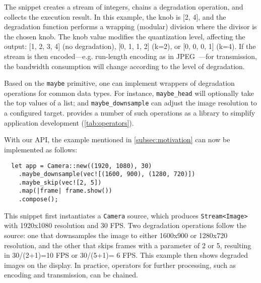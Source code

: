 The snippet creates a stream of integers, chains a degradation operation, and
collects the execution result. In this example, the knob is [2, 4], and the
degradation function performs a wrapping (modular) division where the divisor is
the chosen knob. The knob value modifies the quantization level, affecting the
output: [1, 2, 3, 4] (no degradation), [0, 1, 1, 2] (k=2), or [0, 0, 0, 1]
(k=4). If the stream is then encoded---e.g. run-length encoding as in
JPEG~\cite{wallace1992jpeg}---for transmission, the bandwidth consumption will
change according to the level of degradation.

Based on the \texttt{maybe} primitive, one can implement wrappers of degradation
operations for common data types. For instance, \texttt{maybe\_head} will
optionally take the top values of a list; and \texttt{maybe\_downsample} can
adjust the image resolution to a configured target. \sysname{} provides a number
of such operations as a library to simplify application development
(\autoref{tab:operators}).

With our API, the example mentioned in \autoref{subsec:motivation} can now be
implemented as follows:

\vspace{-2pt}
\begin{lstlisting}
  let app = Camera::new((1920, 1080), 30)
    .maybe_downsample(vec![(1600, 900), (1280, 720)])
    .maybe_skip(vec![2, 5])
    .map(|frame| frame.show())
    .compose();
\end{lstlisting}

This snippet first instantiates a \texttt{Camera} source, which produces
\texttt{Stream<Image>} with 1920x1080 resolution and 30 FPS\@. Two degradation
operations follow the source: one that downsamples the image to either 1600x900 or
1280x720 resolution, and the other that skips frames with a parameter of 2 or 5, resulting
in 30/(2+1)=10 FPS or 30/(5+1)= 6 FPS\@. This example then shows degraded images
on the display. In practice, operators for further processing, such as encoding and
transmission, can be chained.

